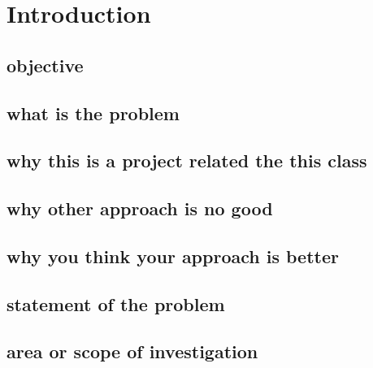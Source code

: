 \section{Introduction}


\subsection{objective}
\subsection{what is the problem}
\subsection{why this is a project related the this class}
\subsection{why other approach is no good}
\subsection{why you think your approach is better}
\subsection{statement of the problem}
\subsection{area or scope of investigation}